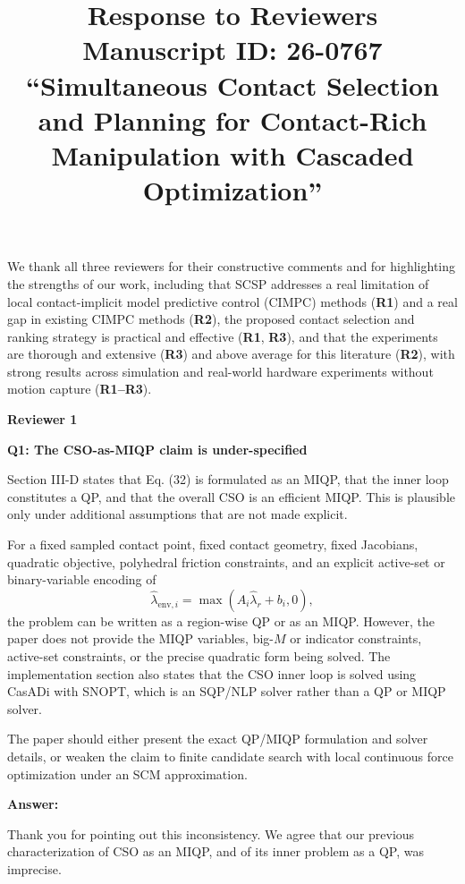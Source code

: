 \documentclass[journal,10pt]{IEEEtran}
\newcommand{\reviewer}[1]{\par\smallskip\noindent
 \textcolor{responseblue}{\textbf{#1\hspace{0.2em}}}}
\newcommand{\question}[2]{\par\smallskip\noindent
 \color{responseblue}\textbf{Q#1: #2}\par\nobreak\noindent\color{responseblue}}
\newcommand{\answer}{\par\smallskip\noindent\color{black}\textbf{Answer: }\ignorespaces
}
\newcommand{\PaperID}{26-0767}
\newcommand{\PaperTitle}{Simultaneous Contact Selection and Planning for Contact-Rich Manipulation with Cascaded Optimization}
\begin{document}
\title{\LARGE\bfseries Response to Reviewers\\
 \normalfont\normalsize Manuscript ID: \PaperID\\
 \normalfont ``\PaperTitle''}
\maketitle

We thank all three reviewers for their constructive comments and for highlighting the strengths of our work, including that SCSP addresses a real limitation of local contact-implicit model predictive control (CIMPC) methods (\textbf{R1}) and a real gap in existing CIMPC methods (\textbf{R2}), the proposed contact selection and ranking strategy is practical and effective (\textbf{R1}, \textbf{R3}), and that the experiments are thorough and extensive (\textbf{R3}) and above average for this literature (\textbf{R2}), with strong results across simulation and real-world hardware experiments without motion capture (\textbf{R1--R3}).

\reviewer{Reviewer 1}

\question{1}{The CSO-as-MIQP claim is under-specified}

Section III-D states that Eq. (32) is formulated as an MIQP, that the inner loop constitutes a QP, and that the overall CSO is an efficient MIQP. This is plausible only under additional assumptions that are not made explicit.

For a fixed sampled contact point, fixed contact geometry, fixed Jacobians, quadratic objective, polyhedral friction constraints, and an explicit active-set or binary-variable encoding of
\begin{equation}
 \hat{\lambda}_{\text{env},i}=\max(A_i\hat{\lambda}_r+b_i,0),
\end{equation}
the problem can be written as a region-wise QP or as an MIQP. However, the paper does not provide the MIQP variables, big-$M$ or indicator constraints, active-set constraints, or the precise quadratic form being solved. The implementation section also states that the CSO inner loop is solved using CasADi with SNOPT, which is an SQP/NLP solver rather than a QP or MIQP solver.

The paper should either present the exact QP/MIQP formulation and solver details, or weaken the claim to finite candidate search with local continuous force optimization under an SCM approximation.

\answer
Thank you for pointing out this inconsistency. We agree that our
previous characterization of CSO as an MIQP, and of its inner problem
as a QP, was imprecise.
\end{document}
